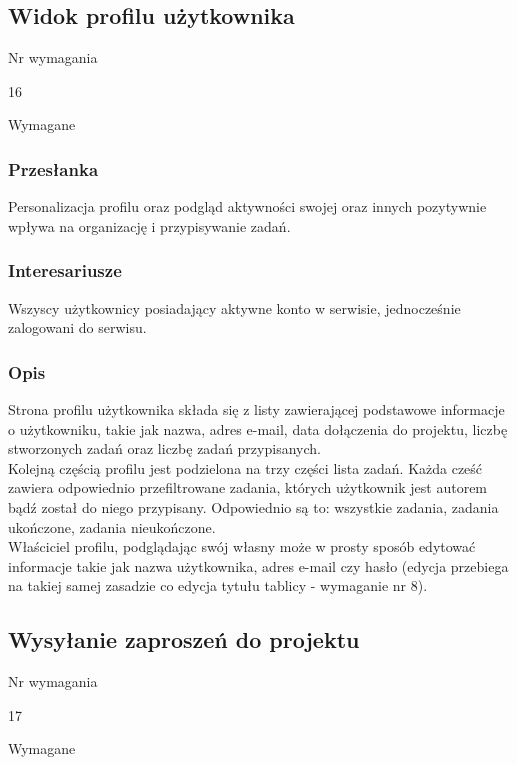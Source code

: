 \documentclass[eng,printmode]{mgr}
\begin{document}
\subsection{Widok profilu użytkownika}
\begin{labeling}{Nr wymagania}
\item [Nr wymagania:] 16
\item [Priorytet:] Wymagane
\end{labeling}

\subsubsection{Przesłanka}
Personalizacja profilu oraz podgląd aktywności swojej oraz innych pozytywnie wpływa na organizację i przypisywanie zadań. 

\subsubsection{Interesariusze}
Wszyscy użytkownicy posiadający aktywne konto w serwisie, jednocześnie zalogowani do serwisu.

\subsubsection{Opis}
Strona profilu użytkownika składa się z listy zawierającej podstawowe informacje o użytkowniku, takie jak nazwa, adres e-mail, data dołączenia do projektu, liczbę stworzonych zadań oraz liczbę zadań przypisanych. \\
Kolejną częścią profilu jest podzielona na trzy części lista zadań. Każda cześć zawiera odpowiednio przefiltrowane zadania, których użytkownik jest autorem bądź został do niego przypisany. Odpowiednio są to: wszystkie zadania, zadania ukończone, zadania nieukończone. \\
Właściciel profilu, podglądając swój własny może w prosty sposób edytować informacje takie jak nazwa użytkownika, adres e-mail czy hasło (edycja przebiega na takiej samej zasadzie co edycja tytułu tablicy - wymaganie nr 8).

\subsection{Wysyłanie zaproszeń do projektu}
\begin{labeling}{Nr wymagania}
\item [Nr wymagania:] 17
\item [Priorytet:] Wymagane
\end{labeling}
\end{document}
